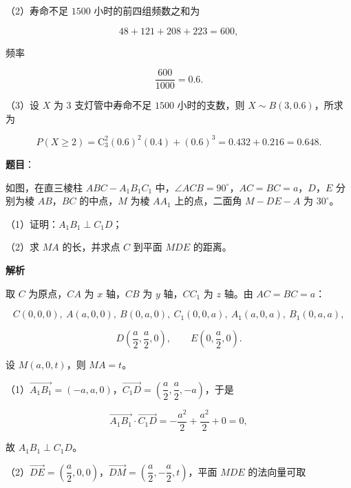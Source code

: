 \begin{answer}
（2）寿命不足 $1500$ 小时的前四组频数之和为

\nopagebreak[4]
\[48+121+208+223=600,\]

频率

\nopagebreak[4]
\[\frac{600}{1000}=0.6.\]

（3）设 $X$ 为 $3$ 支灯管中寿命不足 $1500$ 小时的支数，则 $X\sim B(3,0.6)$，所求为

\nopagebreak[4]
\[P(X\geqslant2)=\mathrm C_3^2(0.6)^2(0.4)+(0.6)^3=0.432+0.216=0.648.\]


\end{answer}
\begin{answer}

\textbf{题目}：

如图，在直三棱柱 $ABC-A_1B_1C_1$ 中，$\angle ACB=90^\circ$，$AC=BC=a$，$D$，$E$ 分别为棱 $AB$，$BC$ 的中点，$M$ 为棱 $AA_1$ 上的点，二面角 $M-DE-A$ 为 $30^\circ$。

（1）证明：$A_1B_1\perp C_1D$；

（2）求 $MA$ 的长，并求点 $C$ 到平面 $MDE$ 的距离。
\nopagebreak[4]
\begin{center}\end{center}
\nopagebreak[4]
\textbf{解析}

取 $C$ 为原点，$CA$ 为 $x$ 轴，$CB$ 为 $y$ 轴，$CC_1$ 为 $z$ 轴。由 $AC=BC=a$：

\nopagebreak[4]
\[C(0,0,0),\ A(a,0,0),\ B(0,a,0),\ C_1(0,0,a),\ A_1(a,0,a),\ B_1(0,a,a),\]

\nopagebreak[4]
\[D\left(\frac a2,\frac a2,0\right),\qquad E\left(0,\frac a2,0\right).\]

设 $M(a,0,t)$，则 $MA=t$。

（1）$\overrightarrow{A_1B_1}=(-a,a,0)$，$\overrightarrow{C_1D}=\left(\dfrac a2,\dfrac a2,-a\right)$，于是

\nopagebreak[4]
\[\overrightarrow{A_1B_1}\cdot\overrightarrow{C_1D}=-\frac{a^2}2+\frac{a^2}2+0=0,\]

故 $A_1B_1\perp C_1D$。

（2）$\overrightarrow{DE}=\left(\dfrac a2,0,0\right)$，$\overrightarrow{DM}=\left(\dfrac a2,-\dfrac a2,t\right)$，平面 $MDE$ 的法向量可取


\end{answer}
